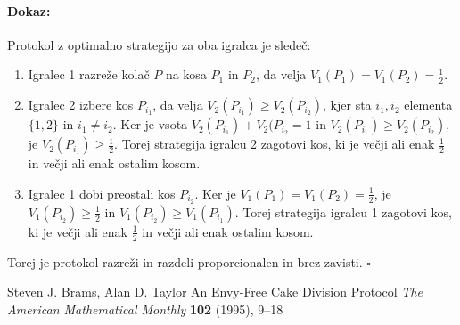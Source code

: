 \documentclass[a4paper, 12pt]{article}
\newenvironment{dokaz}{\paragraph{Dokaz:}}{\hfill$\square$}
\begin{document}
	\begin{dokaz}
		Protokol z optimalno strategijo za oba igralca je sledeč:
		\begin{enumerate}
			
			\item Igralec 1 razreže kolač $P$ na kosa $P_1$ in $P_2$, da velja $V_1 (P_1) = V_1 (P_2) = \frac{1}{2}$.
			
			\item Igralec 2 izbere kos $P_{i_1}$, da velja $V_2 (P_{i_1}) \geq V_2 (P_{i_2})$, kjer sta $i_1, i_2$ elementa $\{1, 2\}$ in $i_1 \neq i_2$. Ker je vsota $V_2 (P_{i_1}) + V_2 (P_{i_2} = 1$ in $V_2 (P_{i_1}) \geq V_2 (P_{i_2})$, je $V_2 (P_{i_1}) \geq \frac{1}{2}$. Torej strategija igralcu 2 zagotovi kos, ki je večji ali enak $\frac{1}{2}$ in večji ali enak ostalim kosom.
			
			\item Igralec 1 dobi preostali kos $P_{i_2}$. Ker je $V_1 (P_1) = V_1 (P_2) = \frac{1}{2}$, je $V_1 (P_{i_2}) \geq \frac{1}{2}$ in $V_1 (P_{i_2}) \geq V_1 (P_{i_1})$. Torej strategija igralcu 1 zagotovi kos, ki je večji ali enak $\frac{1}{2}$ in večji ali enak ostalim kosom.
			
		\end{enumerate}
	
		Torej je protokol razreži in razdeli proporcionalen in brez zavisti.
	\end{dokaz}
	
	\pagebreak
	
	\begin{thebibliography}{5}
		
		Steven J. Brams, Alan D. Taylor
		An Envy-Free Cake Division Protocol
		\textit{The American Mathematical Monthly} \textbf{102} (1995), 9–18
		
	\end{thebibliography}
	
\end{document}
